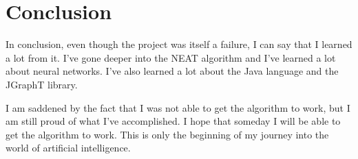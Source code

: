 \documentclass[a4paper, 12pt]{article}
\begin{document}
\section{Conclusion}

In conclusion, even though the project was itself a failure, I can say that I learned a lot from it. I've gone deeper into the NEAT algorithm and I've learned a lot about neural networks. I've also learned a lot about the Java language and the JGraphT library.

I am saddened by the fact that I was not able to get the algorithm to work, but I am still proud of what I've accomplished. I hope that someday I will be able to get the algorithm to work. This is only the beginning of my journey into the world of artificial intelligence.
\end{document}
